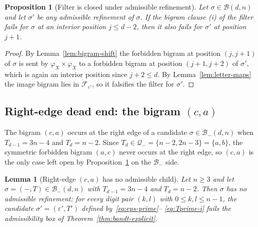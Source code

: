 \documentclass{amsart}
\newtheorem{proposition}[theorem]{Proposition}
\newtheorem{lemma}[theorem]{Lemma}
\theoremstyle{definition}
\theoremstyle{remark}
\begin{document}
\begin{proposition}[Filter is closed under admissible refinement]
\label{prop:filter-closed}
Let $\sigma \in \mathcal{B}(d, n)$ and let $\sigma'$ be any
admissible refinement of $\sigma$.  If the bigram clause
\textup{(i)} of the filter fails for $\sigma$ at an interior
position $j \le d - 2$, then it also fails for $\sigma'$ at position
$j + 1$.
\end{proposition}

\begin{proof}
By Lemma~\ref{lem:bigram-shift} the forbidden bigram at position
$(j, j+1)$ of $\sigma$ is sent by $\varphi_X \times \varphi_X$ to a
forbidden bigram at position $(j+1, j+2)$ of $\sigma'$, which is
again an interior position since $j + 2 \le d$.  By
Lemma~\ref{lem:letter-maps} the image bigram lies in
$\mathcal{F}_{\varepsilon'}$, so it falsifies the filter for
$\sigma'$.
\end{proof}

\subsection{Right-edge dead end: the bigram $(c, a)$}
\label{ssec:right-edge-ca}

The bigram $(c, a)$ occurs at the right edge of a candidate
$\sigma \in \mathcal{B}_-(d, n)$ when $T_{d-1} = 3n - 4$ and
$T_d = n - 2$.  Since $T_d \in \mathcal{Q}_- = \{n-2, 2n-3\} =
\{a, b\}$, the symmetric forbidden bigram $(a, c)$ never occurs at
the right edge, so $(c, a)$ is the only case left open by
Proposition~\ref{prop:filter-closed} on the $\mathcal{B}_-$ side.

\begin{lemma}[Right-edge $(c, a)$ has no admissible child]
\label{lem:right-edge-ca-dead}
Let $n \ge 3$ and let $\sigma = (-, T) \in \mathcal{B}_-(d, n)$ with
$T_{d-1} = 3n - 4$ and $T_d = n - 2$.  Then $\sigma$ has no
admissible refinement: for every digit pair $(k, l)$ with
$0 \le k, l \le n - 1$, the candidate
$\sigma' = (\varepsilon', T')$ defined by~\eqref{eq:eps-prime}--%
\eqref{eq:Tprime-i} fails the admissibility box of
Theorem~\ref{thm:bandt-explicit}.
\end{lemma}
\end{document}
